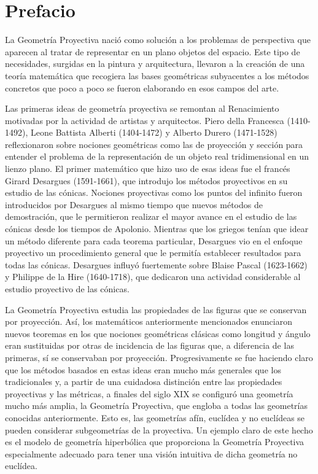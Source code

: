 
\chapter*{Prefacio} 

\justifying La Geometría Proyectiva nació como solución a los problemas de perspectiva que
aparecen al tratar de representar en un plano objetos del espacio. Este tipo de necesidades, surgidas en la pintura y arquitectura, llevaron a la creación de una teoría
matemática que recogiera las bases geométricas subyacentes a los métodos concretos
que poco a poco se fueron elaborando en esos campos del arte.

Las primeras ideas de geometría proyectiva se remontan al Renacimiento motivadas
por la actividad de artistas y arquitectos. Piero della Francesca (1410-1492), Leone
Battista Alberti (1404-1472) y Alberto Durero (1471-1528) reflexionaron sobre nociones
geométricas como las de proyección y sección para entender el problema de la representación de un objeto real tridimensional en un lienzo plano. El primer matemático
que hizo uso de esas ideas fue el francés Girard Desargues (1591-1661), que introdujo los métodos proyectivos en su estudio de las cónicas. Nociones proyectivas como
los puntos del infinito fueron introducidos por Desargues al mismo tiempo que nuevos
métodos de demostración, que le permitieron realizar el mayor avance en el estudio
de las cónicas desde los tiempos de Apolonio. Mientras que los griegos tenían que
idear un método diferente para cada teorema particular, Desargues vio en el enfoque
proyectivo un procedimiento general que le permitía establecer resultados para todas
las cónicas. Desargues influyó fuertemente sobre Blaise Pascal (1623-1662) y Philippe
de la Hire (1640-1718), que dedicaron una actividad considerable al estudio proyectivo
de las cónicas.
 
La Geometría Proyectiva estudia las propiedades de las figuras que se conservan por
proyección. Así, los matemáticos anteriormente mencionados enunciaron nuevos teoremas en los que nociones geométricas clásicas como longitud y ángulo eran sustituidas
por otras de incidencia de las figuras que, a diferencia de las primeras, sí se conservaban por proyección. Progresivamente se fue haciendo claro que los métodos basados en
estas ideas eran mucho más generales que los tradicionales y, a partir de una cuidadosa
distinción entre las propiedades proyectivas y las métricas, a finales del siglo XIX se
configuró una geometría mucho más amplia, la Geometría Proyectiva, que engloba a
todas las geometrías conocidas anteriormente. Esto es, las geometrías afín, euclídea y
no euclídeas se pueden considerar subgeometrías de la proyectiva. Un ejemplo claro
de este hecho es el modelo de geometría hiperbólica que proporciona la Geometría
Proyectiva especialmente adecuado para tener una visión intuitiva de dicha geometría
no euclídea.

